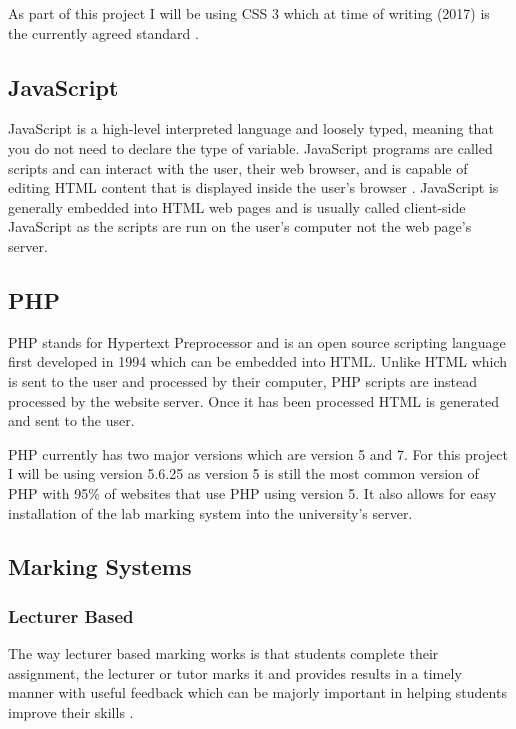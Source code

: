 \documentclass[12pt]{article}  %
\begin{document}
As part of this project I will be using CSS 3 which at time of writing (2017) is the currently agreed standard \cite{noauthor_css_nodate}.


\subsection{JavaScript}

JavaScript is a high-level interpreted language and loosely typed, meaning that you do not need to declare the type of  variable. JavaScript programs are called scripts and can interact with the user, their web browser, and is capable of editing HTML content that is displayed inside the user's browser \cite{flanagan_javascript:_2006}. JavaScript is generally embedded into HTML web pages and is usually called client-side JavaScript as the scripts are run on the user's computer not the web page's server.



\subsection{PHP}
\label{sec:php}

PHP stands for Hypertext Preprocessor and is an open source scripting language first developed in 1994 \cite{noauthor_php:_nodate} which can be embedded into HTML. Unlike HTML which is sent to the user and processed by their computer, PHP scripts are instead processed by the website server. Once it has been processed HTML is generated and sent to the user. 

PHP currently has two major versions which are version 5 and 7. For this project I will be using version 5.6.25 as version 5 is still the most common version of PHP \cite{noauthor_usage_nodate} with 95\% of websites that use PHP using version 5. It also allows for easy installation of the lab marking system into the university's server.



\subsection{Marking Systems}

\subsubsection{Lecturer Based}
The way lecturer based marking works is that students complete their assignment, the lecturer or tutor marks it and provides results in a timely manner with useful feedback which can be majorly important in helping students improve their skills  \cite{tang_investigating_2011}.
\end{document}
